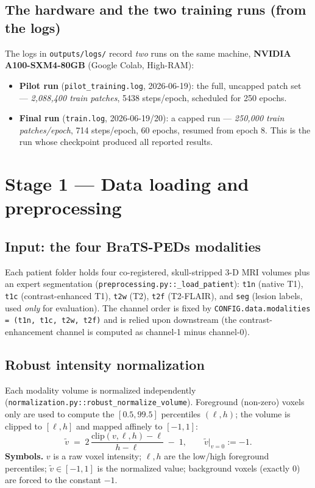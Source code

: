 \documentclass[11pt,a4paper]{article}
\newcommand{\code}[1]{\texttt{\small #1}}
\begin{document}
\subsection{The hardware and the two training runs (from the logs)}
The logs in \code{outputs/logs/} record \emph{two} runs on the same machine,
\textbf{NVIDIA A100-SXM4-80GB} (Google Colab, High-RAM):
\begin{itemize}[leftmargin=1.4em,itemsep=1pt]
\item \textbf{Pilot run} (\code{pilot\_training.log}, 2026-06-19): the full,
uncapped patch set --- \emph{2{,}088{,}400 train patches}, 5438 steps/epoch,
scheduled for 250 epochs.
\item \textbf{Final run} (\code{train.log}, 2026-06-19/20): a capped run ---
\emph{250{,}000 train patches/epoch}, 714 steps/epoch, 60 epochs, resumed from
epoch 8. This is the run whose checkpoint produced all reported results.
\end{itemize}

\section{Stage 1 — Data loading and preprocessing}

\subsection{Input: the four BraTS-PEDs modalities}
Each patient folder holds four co-registered, skull-stripped 3-D MRI volumes plus
an expert segmentation (\code{preprocessing.py::\_load\_patient}):
\code{t1n} (native T1), \code{t1c} (contrast-enhanced T1), \code{t2w} (T2),
\code{t2f} (T2-FLAIR), and \code{seg} (lesion labels, used \emph{only} for
evaluation). The channel order is fixed by
\code{CONFIG.data.modalities = (t1n, t1c, t2w, t2f)} and is relied upon
downstream (the contrast-enhancement channel is computed as channel-1 minus
channel-0).

\subsection{Robust intensity normalization}
Each modality volume is normalized independently
(\code{normalization.py::robust\_normalize\_volume}). Foreground (non-zero)
voxels only are used to compute the $[0.5, 99.5]$ percentiles
$(\ell, h)$; the volume is clipped to $[\ell,h]$ and mapped affinely to $[-1,1]$:
\begin{equation}
\tilde v \;=\; 2\,\frac{\mathrm{clip}(v,\ell,h)-\ell}{h-\ell}\;-\;1,
\qquad \tilde v\big|_{v=0} := -1 .
\end{equation}
\textbf{Symbols.} $v$ is a raw voxel intensity; $\ell,h$ are the low/high
foreground percentiles; $\tilde v\in[-1,1]$ is the normalized value; background
voxels (exactly $0$) are forced to the constant $-1$.
\end{document}
